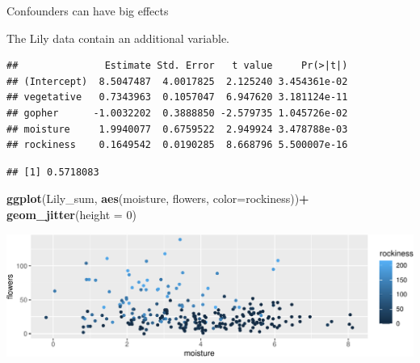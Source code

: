 \documentclass[
  ignorenonframetext,
]{beamer}
\newenvironment{Shaded}{\begin{snugshade}}{\end{snugshade}}
\newcommand{\DataTypeTok}[1]{\textcolor[rgb]{0.13,0.29,0.53}{#1}}
\newcommand{\DecValTok}[1]{\textcolor[rgb]{0.00,0.00,0.81}{#1}}
\newcommand{\KeywordTok}[1]{\textcolor[rgb]{0.13,0.29,0.53}{\textbf{#1}}}
\newcommand{\NormalTok}[1]{#1}
\newcommand{\OperatorTok}[1]{\textcolor[rgb]{0.81,0.36,0.00}{\textbf{#1}}}
\newcommand{\StringTok}[1]{\textcolor[rgb]{0.31,0.60,0.02}{#1}}
\begin{document}
\begin{frame}[fragile]{Confounders can have big effects}
\protect\hypertarget{confounders-can-have-big-effects}{}

The Lily data contain an additional variable. \scriptsize

\begin{Shaded}
\end{Shaded}

\begin{verbatim}
##               Estimate Std. Error   t value     Pr(>|t|)
## (Intercept)  8.5047487  4.0017825  2.125240 3.454361e-02
## vegetative   0.7343963  0.1057047  6.947620 3.181124e-11
## gopher      -1.0032202  0.3888850 -2.579735 1.045726e-02
## moisture     1.9940077  0.6759522  2.949924 3.478788e-03
## rockiness    0.1649542  0.0190285  8.668796 5.500007e-16
\end{verbatim}

\begin{verbatim}
## [1] 0.5718083
\end{verbatim}

\begin{Shaded}
\begin{Highlighting}[]
\KeywordTok{ggplot}\NormalTok{(Lily_sum, }\KeywordTok{aes}\NormalTok{(moisture, flowers, }\DataTypeTok{color=}\NormalTok{rockiness))}\OperatorTok{+}
\StringTok{  }\KeywordTok{geom_jitter}\NormalTok{(}\DataTypeTok{height =} \DecValTok{0}\NormalTok{)}
\end{Highlighting}
\end{Shaded}

\includegraphics{Regression_and_ANOVA_files/figure-beamer/unnamed-chunk-10-1.pdf}

\end{frame}
\end{document}
